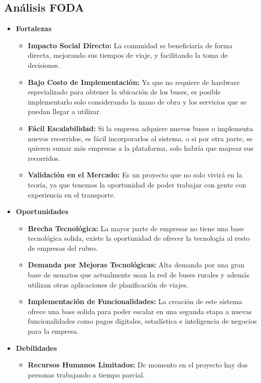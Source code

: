 \documentclass[12pt]{article}
\begin{document}
\subsection{Análisis FODA}
    \begin{itemize}
    \item \textbf{Fortalezas}
    \begin{itemize}
        \item \textbf{Impacto Social Directo:} La comunidad se beneficiaría de forma directa, mejorando sus tiempos de viaje, y facilitando la toma de decisiones. 
        \item \textbf{Bajo Costo de Implementación:} Ya que no requiere de hardware especializado para obtener la ubicación de los buses, es posible implementarlo solo considerando la mano de obra y los servicios que se puedan llegar a utilizar.
        \item \textbf{Fácil Escalabilidad:} Si la empresa adquiere nuevos buses o implementa nuevos recorridos, es fácil incorporarlos al sistema. o si por otra parte, se quieren sumar más empresas a la plataforma, solo habría que mapear sus recorridos.
        \item \textbf{Validación en el Mercado:} Es un proyecto que no solo vivirá en la teoría, ya que tenemos la oportunidad de poder trabajar con gente con experiencia en el transporte.
    \end{itemize}
    \item \textbf{Oportunidades}
    \begin{itemize}
        \item \textbf{Brecha Tecnológica: }La mayor parte de empresas no tiene una base tecnológica solida, existe la oportunidad de ofrecer la tecnología al resto de empresas del rubro.
        \item \textbf{Demanda por Mejoras Tecnológicas: }Alta demanda por una gran base de usuarios que actualmente usan la red de buses rurales y además utilizan otras aplicaciones de planificación de viajes.
        \item \textbf{Implementación de Funcionalidades: }La creación de este sistema ofrece una base solida para poder escalar en una segunda etapa a nuevas funcionalidades como pagos digitales, estadística e inteligencia de negocios para la empresa.
    \end{itemize}
    \newpage
     \item \textbf{Debilidades}
    \begin{itemize}
        \item \textbf{Recursos Humanos Limitados: }De momento en el proyecto hay dos personas trabajando a tiempo parcial.

\end{itemize}
\end{itemize}
\end{document}
